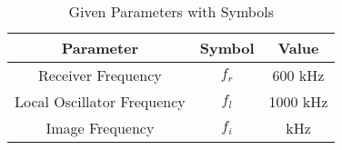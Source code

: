 \begin{table}[h]
    \centering
    \begin{tabular}{|c|c|c|}
        \hline
        \textbf{Parameter} & \textbf{Symbol} & \textbf{Value} \\
        \hline
        Receiver Frequency & \(f_r\) & 600 kHz \\
        \hline
        Local Oscillator Frequency & \(f_l\) & 1000 kHz \\
        \hline
        Image Frequency & \(f_i\) & \underline{\hspace{2cm}} kHz \\
        \hline
    \end{tabular}
    \caption{Given Parameters with Symbols}
\end{table}
